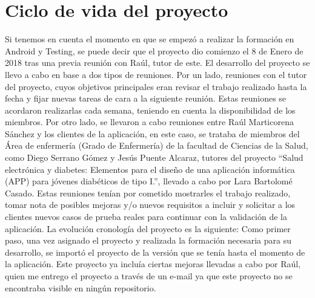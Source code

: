 \section{Ciclo de vida del proyecto}
Si tenemos en cuenta el momento en que se empezó a realizar la formación en Android y Testing, se puede decir que el proyecto dio comienzo el 8 de Enero de 2018 tras una previa reunión con Raúl, tutor de este.
El desarrollo del proyecto se llevo a cabo en base a dos tipos de reuniones.
Por un lado, reuniones con el tutor del proyecto, cuyos objetivos principales eran revisar el trabajo realizado hasta la fecha y fijar nuevas tareas de cara a la siguiente reunión. Estas reuniones se acordaron realizarlas cada semana, teniendo en cuenta la disponibilidad de los miembros. 
Por otro lado, se llevaron a cabo reuniones entre Raúl Marticorena Sánchez y los clientes de la aplicación, en este caso, se trataba de miembros del Área de enfermería (Grado de Enfermería) de la facultad de Ciencias de la Salud, como Diego Serrano Gómez y Jesús Puente Alcaraz, tutores del proyecto ``Salud electrónica y diabetes: Elementos para el diseño de una aplicación informática (APP) para jóvenes diabéticos de tipo I.'', llevado a cabo por Lara Bartolomé Casado. Estas reuniones tenían por cometido mostrarles el trabajo realizado, tomar nota de posibles mejoras y/o nuevos requisitos a incluir y solicitar a los clientes nuevos casos de prueba reales para continuar con la validación de la aplicación.
La evolución cronología del proyecto es la siguiente:
Como primer paso, una vez asignado el proyecto y realizada la formación necesaria para su desarrollo, se importó el proyecto de la versión que se tenía hasta el momento de la aplicación. Este proyecto ya incluía ciertas mejoras llevadas a cabo por Raúl, quien me entrego el proyecto a través de un e-mail ya que este proyecto no se encontraba visible en ningún repositorio.

